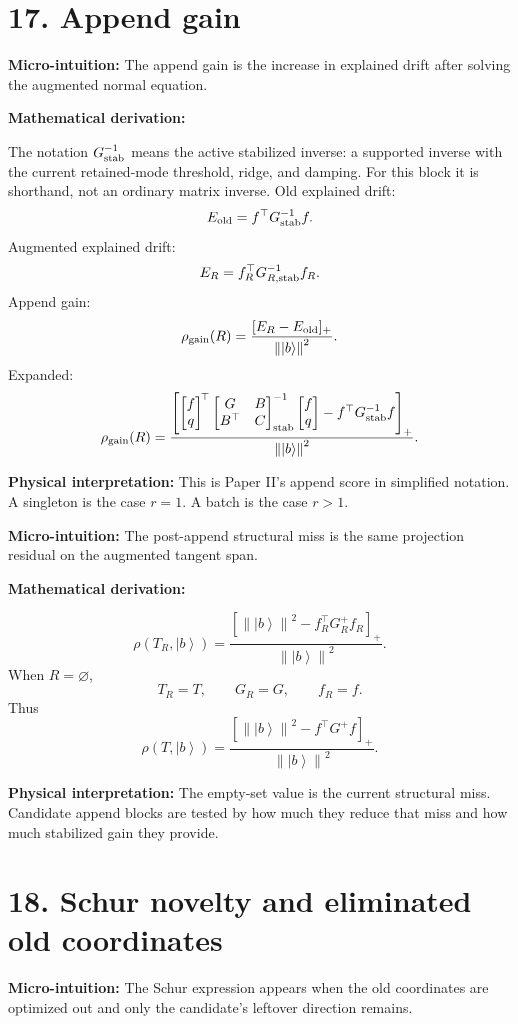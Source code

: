 \documentclass[10pt,twocolumn]{article}
\newcommand{\ket}[1]{\left|#1\right\rangle}
\newcommand{\norm}[1]{\left\lVert #1\right\rVert}
\newcommand{\micro}[1]{%
  \par\smallskip
  \noindent\textcolor{deepblue}{\textbf{Micro-intuition:}} #1
  \par\smallskip}
\newcommand{\deriv}{%
  \par\noindent\textcolor{deepviolet}{\textbf{Mathematical derivation:}}\par\vspace{-1mm}}
\newcommand{\phys}[1]{%
  \par\smallskip
  \noindent\textcolor{deepgreen}{\textbf{Physical interpretation:}} #1
  \par\smallskip}
\begin{document}
\section*{17. Append gain}

\micro{The append gain is the increase in explained drift after solving the
augmented normal equation.}

\deriv
The notation \(G_{\rm stab}^{-1}\) means the active stabilized inverse: a
supported inverse with the current retained-mode threshold, ridge, and damping.
For this block it is shorthand, not an ordinary matrix inverse.
Old explained drift:
\[
E_{\rm old}=f^\top G_{\rm stab}^{-1}f.
\]
Augmented explained drift:
\[
E_R=f_R^\top G_{R,{\rm stab}}^{-1}f_R.
\]
Append gain:
\[
\rho_{\rm gain}(R)
=
\frac{[E_R-E_{\rm old}]_+}{\norm{\ket b}^2}.
\]
Expanded:
\[
\rho_{\rm gain}(R)
=
\frac{
\left[
\begin{bmatrix}f\\q\end{bmatrix}^{\!\top}
\begin{bmatrix}G&B\\B^\top&C\end{bmatrix}_{\rm stab}^{-1}
\begin{bmatrix}f\\q\end{bmatrix}
-f^\top G_{\rm stab}^{-1}f
\right]_+
}{\norm{\ket b}^2}.
\]

\phys{This is Paper II's append score in simplified notation. A singleton is the
case \(r=1\). A batch is the case \(r>1\).}

\micro{The post-append structural miss is the same projection residual on the
augmented tangent span.}

\deriv
\[
\rho(T_R,\ket b)
=
\frac{
\left[
\norm{\ket b}^2
-f_R^\top G_R^+f_R
\right]_+
}{\norm{\ket b}^2}.
\]
When \(R=\varnothing\),
\[
T_R=T,\qquad
G_R=G,\qquad
f_R=f.
\]
Thus
\[
\rho(T,\ket b)
=
\frac{
\left[
\norm{\ket b}^2-f^\top G^+f
\right]_+
}{\norm{\ket b}^2}.
\]

\phys{The empty-set value is the current structural miss. Candidate append
blocks are tested by how much they reduce that miss and how much stabilized
gain they provide.}

\section*{18. Schur novelty and eliminated old coordinates}

\micro{The Schur expression appears when the old coordinates are optimized out
and only the candidate's leftover direction remains.}
\end{document}

